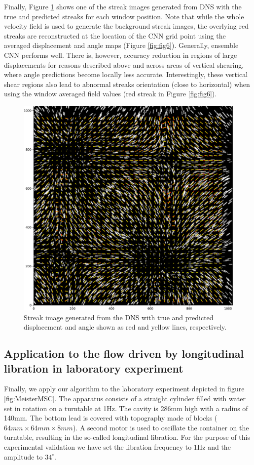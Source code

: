 \documentclass{svjour3}                     %
\begin{document}
Finally, Figure \ref{fig:fig8} shows one of the streak images generated from DNS with the true and predicted streaks for each window position. Note that while the whole velocity field is used to generate the background streak images, the overlying red streaks are reconstructed at the location of the CNN grid point using the averaged displacement and angle maps (Figure \ref{fig:fig6}). Generally, ensemble CNN performs well. There is, however, accuracy reduction in regions of large displacements for reasons described above and across areas of vertical shearing, where angle predictions become locally less accurate. Interestingly, these vertical shear regions also lead to abnormal streaks orientation (close to horizontal) when using the window averaged field values (red streak in Figure \ref{fig:fig6}).

\begin{figure}
\includegraphics[width=\textwidth]{figs/figure7.png}
\caption{Streak image generated from the DNS with true and predicted displacement and angle shown as red and yellow lines, respectively.}
\label{fig:fig8}
\end{figure}

\subsection{Application to the flow driven by longitudinal libration in laboratory experiment}\label{experiment}
Finally, we apply our algorithm to the laboratory experiment depicted in figure \ref{fig:MeisterMSC}. The apparatus consists of a straight cylinder filled with water set in rotation on a turntable at 1Hz. The cavity is 286mm high with a radius of 140mm. The bottom lead is covered with topography made of blocks ($64mm\times64mm\times 8mm$). A second motor is used to oscillate the container on the turntable, resulting in the so-called longitudinal libration. For the purpose of this experimental validation we have set the libration frequency to 1Hz and the amplitude to $34^{\circ}$. 
\end{document}
